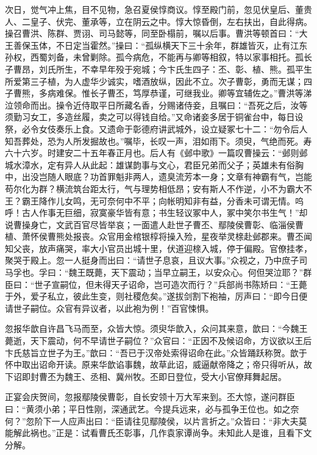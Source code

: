 次日，觉气冲上焦，目不见物，急召夏侯惇商议。惇至殿门前，忽见伏皇后、董贵人、二皇子、伏完、董承等，立在阴云之中。惇大惊昏倒，左右扶出，自此得病。操召曹洪、陈群、贾诩、司马懿等，同至卧榻前，嘱以后事。曹洪等顿首曰：“大王善保玉体，不日定当霍然。”操曰：“孤纵横天下三十余年，群雄皆灭，止有江东孙权，西蜀刘备，未曾剿除。孤今病危，不能再与卿等相叙，特以家事相托。孤长子曹昂，刘氏所生，不幸早年殁于宛城；今卞氏生四子：丕、彰、植、熊。孤平生所爱第三子植，为人虚华少诚实，嗜酒放纵，因此不立。次子曹彰，勇而无谋；四子曹熊，多病难保。惟长子曹丕，笃厚恭谨，可继我业。卿等宜辅佐之。”曹洪等涕泣领命而出。操令近侍取平日所藏名香，分赐诸侍妾，且嘱曰：“吾死之后，汝等须勤习女工，多造丝履，卖之可以得钱自给。”又命诸妾多居于铜雀台中，每日设祭，必令女伎奏乐上食。又遗命于彰德府讲武城外，设立疑冢七十二：“勿令后人知吾葬处，恐为人所发掘故也。”嘱毕，长叹一声，泪如雨下。须臾，气绝而死。寿六十六岁。时建安二十五年春正月也。后人有《邺中歌》一篇叹曹操云：“邺则邺城水漳水，定有异人从此起：雄谋韵事与文心，君臣兄弟而父子；英雄未有俗胸中，出没岂随人眼底？功首罪魁非两人，遗臭流芳本一身；文章有神霸有气，岂能苟尔化为群？横流筑台距太行，气与理势相低昂；安有斯人不作逆，小不为霸大不王？霸王降作儿女鸣，无可奈何中不平；向帐明知非有益，分香未可谓无情。呜呼！古人作事无巨细，寂寞豪华皆有意；书生轻议冢中人，冢中笑尔书生气！”却说曹操身亡，文武百官尽皆举哀；一面遣人赴世子曹丕、鄢陵侯曹彰、临淄侯曹植、萧怀侯曹熊处报丧。众官用金棺银椁将操入殓，星夜举灵榇赴邺郡来。曹丕闻知父丧，放声痛哭，率大小官员出城十里，伏道迎榇入城，停于偏殿。官僚挂孝，聚哭于殿上。忽一人挺身而出曰：“请世子息哀，且议大事。”众视之，乃中庶子司马孚也。孚曰：“魏王既薨，天下震动；当早立嗣王，以安众心。何但哭泣耶？”群臣曰：“世子宣嗣位，但未得天子诏命，岂可造次而行？”兵部尚书陈矫曰：“王薨于外，爱子私立，彼此生变，则社稷危矣。”遂拔剑割下袍袖，厉声曰：“即今日便请世子嗣位。众官有异议者，以此袍为例！”百官悚惧。

忽报华歆自许昌飞马而至，众皆大惊。须臾华歆入，众问其来意，歆曰：“今魏王薨逝，天下震动，何不早请世子嗣位？”众官曰：“正因不及候诏命，方议欲以王后卞氏慈旨立世子为王。”歆曰：“吾已于汉帝处索得诏命在此。”众皆踊跃称贺。歆于怀中取出诏命开读。原来华歆谄事魏，故草此诏，威逼献帝降之；帝只得听从，故下诏即封曹丕为魏王、丞相、冀州牧。丕即日登位，受大小官僚拜舞起居。

正宴会庆贺间，忽报鄢陵侯曹彰，自长安领十万大军来到。丕大惊，遂问群臣曰：“黄须小弟；平日性刚，深通武艺。今提兵远来，必与孤争王位也。如之奈何？”忽阶下一人应声出曰：“臣请往见鄢陵侯，以片言折之。”众皆曰：“非大夫莫能解此祸也。”正是：试看曹氏丕彰事，几作袁家谭尚争。未知此人是谁，且看下文分解。